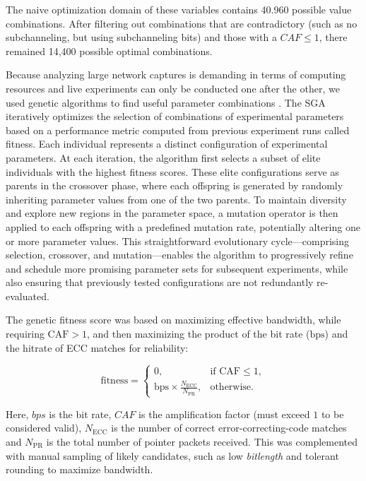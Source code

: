 \documentclass[journal]{IEEEtran}
\begin{document}
The naive optimization domain of these variables contains 40.960 possible value combinations. After filtering out combinations that are contradictory (such as no subchanneling, but using subchanneling bits) and those with a $CAF \leq 1$, there remained 14,400 possible optimal combinations. 

Because analyzing large network captures is demanding in terms of computing resources and live experiments can only be conducted one after the other, we used genetic algorithms to find useful parameter combinations \cite{genai24}. The \ac{SGA} iteratively optimizes the selection of combinations of experimental parameters based on a performance metric computed from previous experiment runs called fitness. Each individual represents a distinct configuration of experimental parameters. At each iteration, the algorithm first selects a subset of elite individuals with the highest fitness scores. These elite configurations serve as parents in the crossover phase, where each offspring is generated by randomly inheriting parameter values from one of the two parents. To maintain diversity and explore new regions in the parameter space, a mutation operator is then applied to each offspring with a predefined mutation rate, potentially altering one or more parameter values. This straightforward evolutionary cycle—comprising selection, crossover, and mutation—enables the algorithm to progressively refine and schedule more promising parameter sets for subsequent experiments, while also ensuring that previously tested configurations are not redundantly re-evaluated.

The genetic fitness score was based on maximizing effective bandwidth, while requiring \(\text{CAF} > 1\), and then maximizing the product of the bit rate (\(\text{bps}\)) and the hitrate of \ac{ECC} matches for reliability:

\begin{equation}
\label{eqfitness}
\text{fitness} = 
\begin{cases}
0, 
& \text{if } \text{CAF} \le 1,\\[6pt]
\text{bps} \times \displaystyle \frac{N_{\text{ECC}}}{N_{\text{PR}}},
& \text{otherwise}.
\end{cases}
\end{equation}

Here, \(\textit{bps}\) is the bit rate, \(\textit{CAF}\) is the amplification factor (must exceed \(1\) to be considered valid),
\(N_{\text{ECC}}\) is the number of correct error-correcting-code matches and 
\(N_{\text{PR}}\) is the total number of pointer packets received.
This was complemented with manual sampling of likely candidates, such as low \textit{bitlength} and tolerant rounding to maximize bandwidth.
\end{document}
